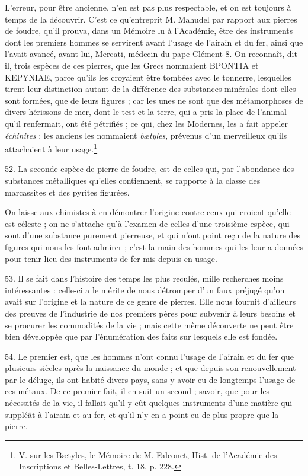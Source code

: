 \documentclass[a4paper, 11pt, oneside, polutonikogreek, french]{article}
\begin{document}
\og L'erreur, pour être ancienne, n'en est pas plus respectable, et on est toujours à temps de la découvrir. C'est ce qu'entreprit M. Mahudel par rapport aux pierres de foudre, qu'il prouva, dans un Mémoire lu à l'Académie, être des instruments dont les premiers hommes se servirent avant l'usage de l'airain et du fer, ainsi que l'avait avancé, avant lui, Mercati, médecin du pape Clément 8. On reconnaît, dit-il, trois espèces de ces pierres, que les Grecs nommaient BPONTIA et KEPYNIAE, parce qu'ils les croyaient être tombées avec le tonnerre, lesquelles tirent leur distinction autant de la différence des substances minérales dont elles sont formées, que de leurs figures ; car les unes ne sont que des métamorphoses de divers hérissons de mer, dont le test et la terre, qui a pris la place de l'animal qu'il renfermait, ont été pétrifiés ; ce qui, chez les Modernes, les a fait appeler \emph{échinites} ; les anciens les nommaient \emph{bætyles}, prévenus d'un merveilleux qu'ils attachaient à leur usage.\footnote{V. sur les Bætyles, le Mémoire de M. Falconet, Hist. de l'Académie des Inscriptions et Belles-Lettres, t. 18, p. 228.} \fg

52. La seconde espèce de pierre de foudre, est de celles qui, par l'abondance des substances métalliques qu'elles contiennent, se rapporte à la classe des marcassites et des pyrites figurées.

On laisse aux chimistes à en démontrer l'origine contre ceux qui croient qu'elle est céleste ; on ne s'attache qu'à l'examen de celles d'une troisième espèce, qui sont d'une substance purement pierreuse, et qui n'ont point reçu de la nature des figures qui nous les font admirer ; c'est la main des hommes qui les leur a données pour tenir lieu des instruments de fer mis depuis en usage.

53. Il se fait dans l'histoire des temps les plus reculés, mille recherches moins intéressantes : celle-ci a le mérite de nous détromper d'un faux préjugé qu'on avait sur l'origine et la nature de ce genre de pierres. Elle nous fournit d'ailleurs des preuves de l'industrie de nos premiers pères pour subvenir à leurs besoins et se procurer les commodités de la vie ; mais cette même découverte ne peut être bien développée que par l'énumération des faits sur lesquels elle est fondée.

54. Le premier est, que les hommes n'ont connu l'usage de l'airain et du fer que plusieurs siècles après la naissance du monde ; et que depuis son renouvellement par le déluge, ils ont habité divers pays, sans y avoir eu de longtemps l'usage de ces métaux. De ce premier fait, il en suit un second ; savoir, que pour les nécessités de la vie, il fallait qu'il y eût quelques instruments d'une matière qui suppléât à l'airain et au fer, et qu'il n'y en a point eu de plus propre que la pierre.
\end{document}
